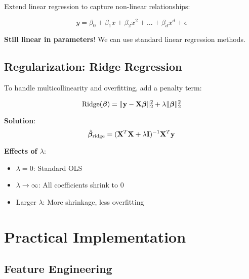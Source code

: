 \documentclass{article}
\begin{document}
Extend linear regression to capture non-linear relationships:

$$y = \beta_0 + \beta_1 x + \beta_2 x^2 + \ldots + \beta_d x^d + \epsilon$$

\textbf{Still linear in parameters}! We can use standard linear regression methods.

\begin{center}
\end{center}

\subsection{Regularization: Ridge Regression}

To handle multicollinearity and overfitting, add a penalty term:

$$\text{Ridge}(\boldsymbol{\beta}) = \|\mathbf{y} - \mathbf{X}\boldsymbol{\beta}\|_2^2 + \lambda\|\boldsymbol{\beta}\|_2^2$$

\textbf{Solution}:
$$\hat{\boldsymbol{\beta}}_{\text{ridge}} = (\mathbf{X}^T\mathbf{X} + \lambda\mathbf{I})^{-1}\mathbf{X}^T\mathbf{y}$$

\textbf{Effects of $\lambda$}:
\begin{itemize}
    \item $\lambda = 0$: Standard OLS
    \item $\lambda \to \infty$: All coefficients shrink to 0
    \item Larger $\lambda$: More shrinkage, less overfitting
\end{itemize}

\section{Practical Implementation}

\subsection{Feature Engineering}
\end{document}
